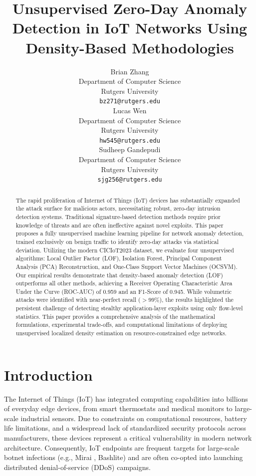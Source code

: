 \documentclass{article}
\title{Unsupervised Zero-Day Anomaly Detection in IoT Networks Using Density-Based Methodologies}
\author{%
  Brian Zhang \\
  Department of Computer Science \\
  Rutgers University \\
  \texttt{bz271@rutgers.edu} \\
  \And
  Lucas Wen \\
  Department of Computer Science \\
  Rutgers University \\
  \texttt{hw545@rutgers.edu} \\
  \And
  Sudheep Gandepudi \\
  Department of Computer Science \\
  Rutgers University \\
  \texttt{sjg256@rutgers.edu} \\
}
\begin{document}
\maketitle

\begin{abstract}
The rapid proliferation of Internet of Things (IoT) devices has substantially expanded the attack surface for malicious actors, necessitating robust, zero-day intrusion detection systems. Traditional signature-based detection methods require prior knowledge of threats and are often ineffective against novel exploits. This paper proposes a fully unsupervised machine learning pipeline for network anomaly detection, trained exclusively on benign traffic to identify zero-day attacks via statistical deviation. Utilizing the modern CICIoT2023 dataset, we evaluate four unsupervised algorithms: Local Outlier Factor (LOF), Isolation Forest, Principal Component Analysis (PCA) Reconstruction, and One-Class Support Vector Machines (OCSVM). Our empirical results demonstrate that density-based anomaly detection (LOF) outperforms all other methods, achieving a Receiver Operating Characteristic Area Under the Curve (ROC-AUC) of 0.959 and an F1-Score of 0.945. While volumetric attacks were identified with near-perfect recall ($>99\%$), the results highlighted the persistent challenge of detecting stealthy application-layer exploits using only flow-level statistics. This paper provides a comprehensive analysis of the mathematical formulations, experimental trade-offs, and computational limitations of deploying unsupervised localized density estimation on resource-constrained edge networks.
\end{abstract}

\section{Introduction}

The Internet of Things (IoT) has integrated computing capabilities into billions of everyday edge devices, from smart thermostats and medical monitors to large-scale industrial sensors. Due to constraints on computational resources, battery life limitations, and a widespread lack of standardized security protocols across manufacturers, these devices represent a critical vulnerability in modern network architecture. Consequently, IoT endpoints are frequent targets for large-scale botnet infections (e.g., Mirai \cite{mirai}, Bashlite) and are often co-opted into launching distributed denial-of-service (DDoS) campaigns.
\end{document}
